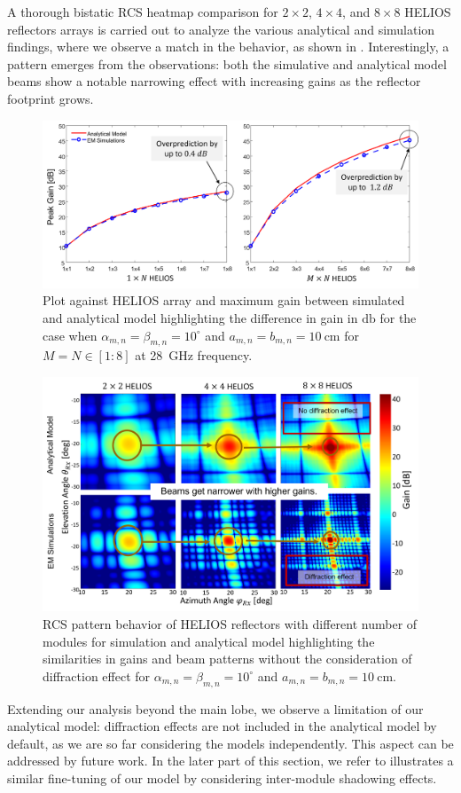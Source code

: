 A thorough bistatic RCS heatmap comparison for $\num{2}\times \num{2}$, $\num{4}\times \num{4}$, and $\num{8}\times \num{8}$ HELIOS reflectors arrays is carried out to analyze the various analytical and simulation findings, where we observe a match in the behavior, as shown in . Interestingly, a pattern emerges from the observations: both the simulative and analytical model beams show a notable narrowing effect with increasing gains as the reflector footprint grows.
\begin{figure}[H]
	\centering
	\includegraphics[width=1.0\linewidth]{images/Section 3 Images/Array_max}
	\caption{Plot against HELIOS array and maximum gain between simulated and analytical model highlighting the difference in gain in $\si{\decibel}$ for the case when $\alpha_{m,n}=\beta_{m,n}=10^\circ$ and $a_{m,n}=b_{m,n}= \SI{10}{\centi\meter}$ for $M=N\in[1:8]$ at \SI{28}{\giga\hertz} frequency.}
	\label{fig:arraymax}
\end{figure}
\begin{figure}[tb]
	\centering
	\includegraphics[width=1.0\linewidth]{images/Section 3 Images/Heatmap_arraz}
	\caption{RCS pattern behavior of HELIOS reflectors with different number of modules for simulation and analytical model highlighting the similarities in gains and beam patterns without the consideration of diffraction effect for $\alpha_{m,n}=\beta_{m,n}=10^\circ$ and $a_{m,n}=b_{m,n}= \SI{10}{\centi\meter}$. }
	\label{fig:heatmaparraz}
\end{figure}
Extending our analysis beyond the main lobe, we observe a limitation of our analytical model: diffraction effects are not included in the analytical model by default, as we are so far considering the models independently. This aspect can be addressed by future work. In the later part of this section, we refer to  illustrates a similar fine-tuning of our model by considering inter-module shadowing effects.
